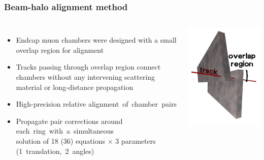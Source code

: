 \documentclass[compress]{beamer}
\begin{document}
\begin{frame}
\frametitle{Beam-halo alignment method}

\vspace{-0.15 cm}
\begin{columns}
\vspace{0.3 cm}
\begin{itemize}
\item Endcap muon chambers were designed with a small overlap region for alignment
\item Tracks passing through overlap region connect chambers without
  any intervening scattering material or long-distance propagation
\item High-precision relative \mbox{alignment of chamber pairs\hspace{-1 cm}}
\item Propagate pair corrections around \mbox{each ring with a simultaneous\hspace{-3 cm}} \\ solution of 18 (36) equations $\times$ 3 parameters \mbox{(1 translation, 2 angles)\hspace{-5 cm}}
\end{itemize}

\includegraphics[width=0.8\linewidth]{overlaps.png}
\end{columns}


\end{frame}
\end{document}
